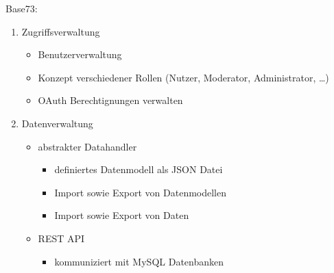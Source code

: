 Base73:
\begin{enumerate}
	\item Zugriffsverwaltung 
        \begin{itemize}
            \item Benutzerverwaltung
            \item Konzept verschiedener Rollen (Nutzer, Moderator, Administrator, \ldots)
            \item OAuth Berechtignungen verwalten
        \end{itemize}
    \item Datenverwaltung
		\begin{itemize}
			\item abstrakter Datahandler
                \begin{itemize}
                    \item definiertes Datenmodell als JSON Datei
                    \item Import sowie Export von Datenmodellen
                    \item Import sowie Export von Daten
                \end{itemize}
            \item REST API
                \begin{itemize}
                    \item kommuniziert mit MySQL Datenbanken
                \end{itemize}
		\end{itemize}
\end{enumerate} 